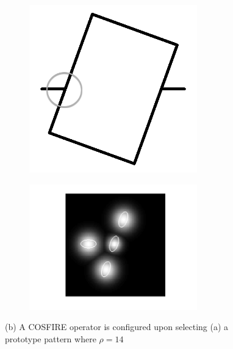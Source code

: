 \begin{figure}[h]
        \centering
        \begin{subfigure}[b]{0.3\textwidth}
                \centering
                \includegraphics[width=0.8\textwidth]{figures/Method/ModelPointOfInterest.png}
                \caption{}
                \label{fig:modelsymbol}
        \end{subfigure}
        \begin{subfigure}[b]{0.3\textwidth}
                \centering
                \includegraphics[width=0.8\textwidth]{figures/Method/COSFIREOPerator.png}
                \caption{}
                \label{fig:cosfireconf}
        \end{subfigure}
        \caption[Example of a COSFIRE operator for a prototype pattern.]{(b) A COSFIRE operator is configured upon selecting (a) a prototype pattern where $\rho = 14$ }
        \label{fig:COSFIREConfigurationExample2}
\end{figure}

